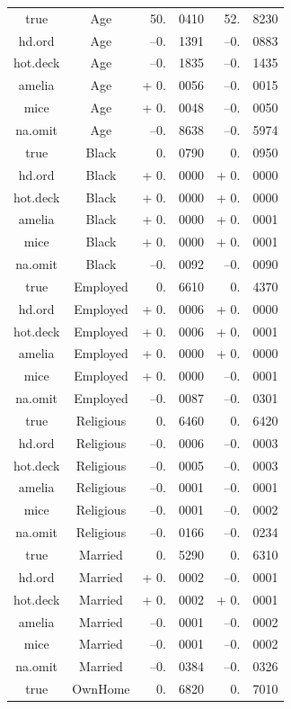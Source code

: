 \documentclass[12pt,econ]{sources/authesis}
\begin{document}
\begin{longtable}{ccr@{}lr@{}l}
 true & Age & 50.&0410 & 52.&8230 \\
 hd.ord & Age & --0.&1391 & --0.&0883 \\ 
 hot.deck & Age & --0.&1835 & --0.&1435 \\
 amelia & Age & + 0.&0056 & --0.&0015 \\ 
 mice & Age & + 0.&0048 & --0.&0050 \\ 
 na.omit & Age & --0.&8638 & --0.&5974 \\
 true & Black & 0.&0790 & 0.&0950 \\ 
 hd.ord & Black & + 0.&0000 & + 0.&0000 \\
 hot.deck & Black & + 0.&0000 & + 0.&0000 \\ 
 amelia & Black & + 0.&0000 & + 0.&0001 \\
 mice & Black & + 0.&0000 & + 0.&0001 \\ 
 na.omit & Black & --0.&0092 & --0.&0090 \\
 true & Employed & 0.&6610 & 0.&4370 \\ 
 hd.ord & Employed & + 0.&0006 & + 0.&0000 \\ 
 hot.deck & Employed & + 0.&0006 & + 0.&0001 \\
 amelia & Employed & + 0.&0000 & + 0.&0000 \\
 mice & Employed & + 0.&0000 & --0.&0001 \\
 na.omit & Employed & --0.&0087 & --0.&0301 \\
 true & Religious & 0.&6460 & 0.&6420 \\ 
 hd.ord & Religious & --0.&0006 & --0.&0003 \\ 
 hot.deck & Religious & --0.&0005 & --0.&0003 \\
 amelia & Religious & --0.&0001 & --0.&0001 \\
 mice & Religious & --0.&0001 & --0.&0002 \\ 
 na.omit & Religious & --0.&0166 & --0.&0234 \\ 
 true & Married & 0.&5290 & 0.&6310 \\
 hd.ord & Married & + 0.&0002 & --0.&0001 \\
 hot.deck & Married & + 0.&0002 & + 0.&0001 \\
 amelia & Married & --0.&0001 & --0.&0002 \\
 mice & Married & --0.&0001 & --0.&0002 \\ 
 na.omit & Married & --0.&0384 & --0.&0326 \\ 
 true & OwnHome & 0.&6820 & 0.&7010 \\

\end{longtable}
\end{document}
